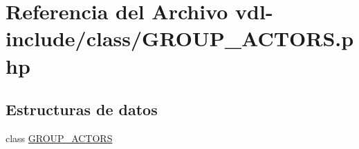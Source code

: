 \hypertarget{GROUP__ACTORS_8php}{\section{Referencia del Archivo vdl-\/include/class/\-G\-R\-O\-U\-P\-\_\-\-A\-C\-T\-O\-R\-S.php}
\label{GROUP__ACTORS_8php}
}
\subsection*{Estructuras de datos}
\begin{DoxyCompactItemize}
\item 
class \hyperlink{classGROUP__ACTORS}{G\-R\-O\-U\-P\-\_\-\-A\-C\-T\-O\-R\-S}
\end{DoxyCompactItemize}

